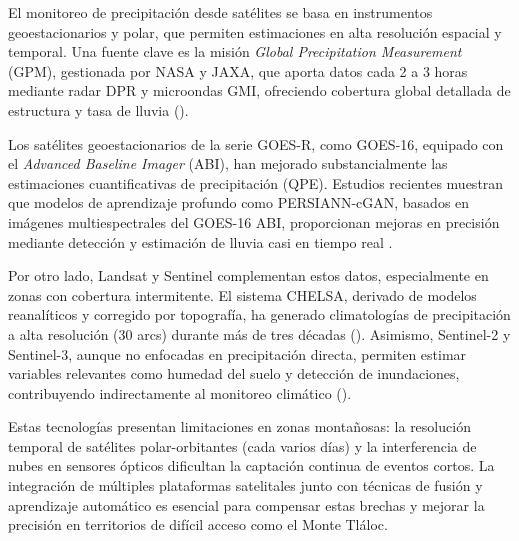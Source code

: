 El monitoreo de precipitación desde satélites se basa en instrumentos geoestacionarios y polar, que permiten estimaciones en alta resolución espacial y temporal. Una fuente clave es la misión \emph{Global Precipitation Measurement} (GPM), gestionada por NASA y JAXA, que aporta datos cada 2 a 3 horas mediante radar DPR y microondas GMI, ofreciendo cobertura global detallada de estructura y tasa de lluvia (\cite{gpm2014}).

Los satélites geoestacionarios de la serie GOES-R, como GOES-16, equipado con el \emph{Advanced Baseline Imager} (ABI), han mejorado substancialmente las estimaciones cuantificativas de precipitación (QPE). Estudios recientes muestran que modelos de aprendizaje profundo como PERSIANN-cGAN, basados en imágenes multiespectrales del GOES-16 ABI, proporcionan mejoras en precisión mediante detección y estimación de lluvia casi en tiempo real \cite{hayatbini2019}.

Por otro lado, Landsat y Sentinel complementan estos datos, especialmente en zonas con cobertura intermitente. El sistema CHELSA, derivado de modelos reanalíticos y corregido por topografía, ha generado climatologías de precipitación a alta resolución (30 arcs) durante más de tres décadas (\cite{karger2016}). Asimismo, Sentinel-2 y Sentinel-3, aunque no enfocadas en precipitación directa, permiten estimar variables relevantes como humedad del suelo y detección de inundaciones, contribuyendo indirectamente al monitoreo climático (\cite{declaro2024}).

Estas tecnologías presentan limitaciones en zonas montañosas: la resolución temporal de satélites polar-orbitantes (cada varios días) y la interferencia de nubes en sensores ópticos dificultan la captación continua de eventos cortos. La integración de múltiples plataformas satelitales junto con técnicas de fusión y aprendizaje automático es esencial para compensar estas brechas y mejorar la precisión en territorios de difícil acceso como el Monte Tláloc.











